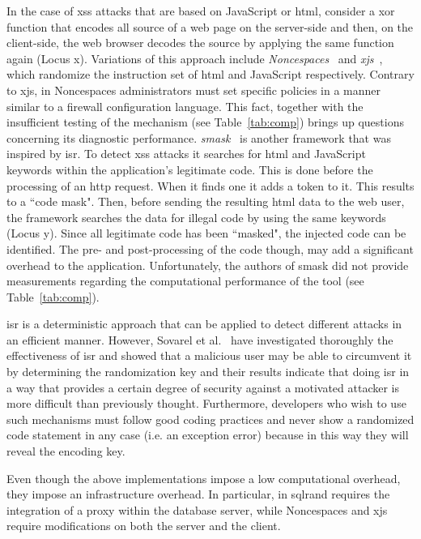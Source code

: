 \documentclass[conference]{IEEEtran}
\begin{document}
In the case of {\sc xss} attacks that are based on JavaScript or {\sc
  html}, consider a {\sc xor} function that encodes all source of a
web page on the server-side and then, on the client-side, the web
browser decodes the source by applying the same function again (Locus
{\sc x}). Variations of this approach include {\it
  Noncespaces}~\cite{GC09} and {\it x{\sc js}}~\cite{APKLM10}, which
randomize the instruction set of {\sc html} and JavaScript
respectively. Contrary to x{\sc js}, in Noncespaces administrators
must set specific policies in a manner similar to a firewall
configuration language. This fact, together with the insufficient
testing of the mechanism (see Table~\ref{tab:comp}) brings up
questions concerning its diagnostic performance. {\it {\sc
    sm}ask}~\cite{JB07} is another framework that was inspired by {\sc
  isr}. To detect {\sc xss} attacks it searches for {\sc html} and
JavaScript keywords within the application's legitimate code. This is
done before the processing of an {\sc http} request. When it finds one
it adds a token to it. This results to a ``code mask". Then, before
sending the resulting {\sc html} data to the web user, the framework
searches the data for illegal code by using the same keywords (Locus
{\sc y}). Since all legitimate code has been ``masked", the injected
code can be identified. The pre- and post-processing of the code
though, may add a significant overhead to the application.
Unfortunately, the authors of {\sc sm}ask did not provide measurements
regarding the computational performance of the tool (see
Table~\ref{tab:comp}).

{\sc isr} is a deterministic approach that can be applied to detect
different attacks in an efficient manner. However, Sovarel et
al.~\cite{SEP05} have investigated thoroughly the effectiveness of
{\sc isr} and showed that a malicious user may be able to circumvent
it by determining the randomization key and their results indicate
that doing {\sc isr} in a way that provides a certain degree of
security against a motivated attacker is more difficult than
previously thought. Furthermore, developers who wish to use such
mechanisms must follow good coding practices and never show a
randomized code statement in any case (i.e. an exception error)
because in this way they will reveal the encoding key.

Even though the above implementations impose a low computational
overhead, they impose an infrastructure overhead. In particular, in
{\sc sql}rand requires the integration of a proxy within the database
server, while Noncespaces and x{\sc js} require modifications on both
the server and the client.
\end{document}
